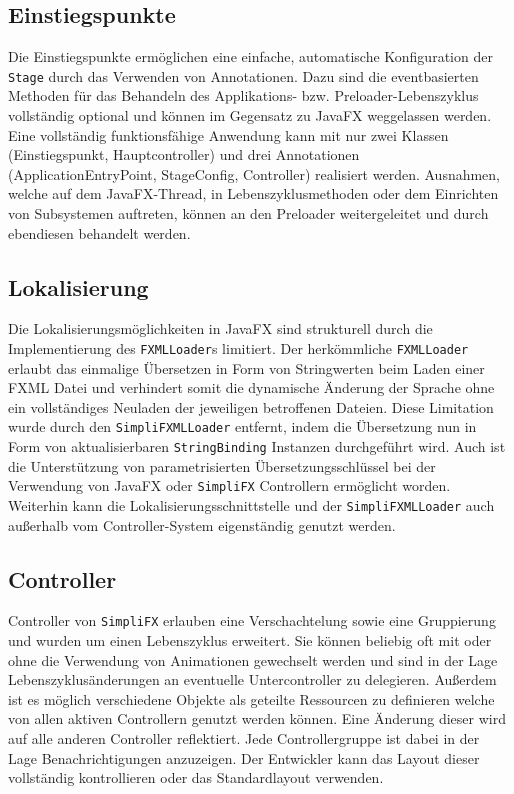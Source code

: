 \subsection{Einstiegspunkte}
Die Einstiegspunkte ermöglichen eine einfache, automatische Konfiguration der \texttt{Stage} durch das Verwenden von Annotationen. Dazu sind die eventbasierten Methoden für das Behandeln des Applikations- bzw. Preloader-Lebenszyklus vollständig optional und können im Gegensatz zu JavaFX weggelassen werden. Eine vollständig funktionsfähige Anwendung kann mit nur zwei Klassen (Einstiegspunkt, Hauptcontroller) und drei Annotationen (ApplicationEntryPoint, StageConfig, Controller) realisiert werden. Ausnahmen, welche auf dem JavaFX-Thread, in Lebenszyklusmethoden oder dem Einrichten von Subsystemen auftreten, können an den Preloader weitergeleitet und durch ebendiesen behandelt werden. 
\subsection{Lokalisierung}
Die Lokalisierungsmöglichkeiten in JavaFX sind strukturell durch die Implementierung des \texttt{FXMLLoader}s limitiert. Der herkömmliche \texttt{FXMLLoader} erlaubt das einmalige Übersetzen in Form von Stringwerten beim Laden einer FXML Datei und verhindert somit die dynamische Änderung der Sprache ohne ein vollständiges Neuladen der jeweiligen betroffenen Dateien. Diese Limitation wurde durch den \texttt{SimpliFXMLLoader} entfernt, indem die Übersetzung nun in Form von aktualisierbaren \texttt{StringBinding} Instanzen durchgeführt wird. Auch ist die Unterstützung von parametrisierten Übersetzungsschlüssel bei der Verwendung von JavaFX oder \texttt{SimpliFX} Controllern ermöglicht worden. Weiterhin kann die Lokalisierungsschnittstelle und der \texttt{SimpliFXMLLoader} auch außerhalb vom Controller-System eigenständig genutzt werden.
\subsection{Controller}
Controller von \texttt{SimpliFX} erlauben eine Verschachtelung sowie eine Gruppierung und wurden um einen Lebenszyklus erweitert. Sie können beliebig oft mit oder ohne die Verwendung von Animationen gewechselt werden und sind in der Lage Lebenszyklusänderungen an eventuelle Untercontroller zu delegieren. Außerdem ist es möglich verschiedene Objekte als geteilte Ressourcen zu definieren welche von allen aktiven Controllern genutzt werden können. Eine Änderung dieser wird auf alle anderen Controller reflektiert. Jede Controllergruppe ist dabei in der Lage Benachrichtigungen anzuzeigen. Der Entwickler kann das Layout dieser vollständig kontrollieren oder das Standardlayout verwenden.
